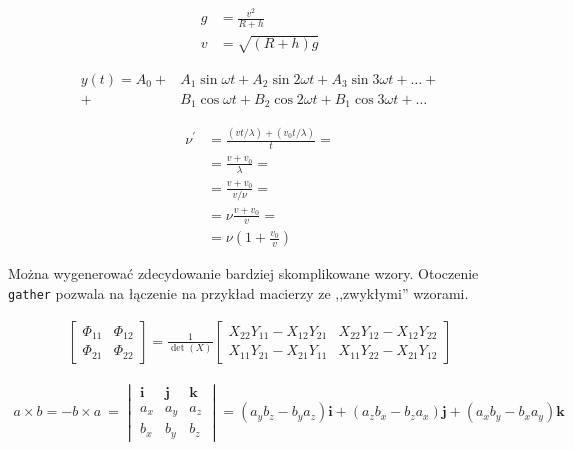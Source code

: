 \begin{align}
    g & = \frac{v^2}{R+h} \\
    v & = \sqrt{ \left( R+h \right) g }
\end{align}

\begin{align}
 y(t) = A_0 
 +& A_1 \sin \omega t + 
    A_2 \sin 2 \omega t + 
    A_3 \sin 3 \omega t + \ldots + \nonumber \\
 +& B_1 \cos \omega t + 
    B_2 \cos 2 \omega t + 
    B_1 \cos 3 \omega t + \ldots
\end{align}

\begin{align}
 \nu^\prime  &= \frac{\left(vt / \lambda \right) + \left( v_0t / \lambda \right)}{t} = \nonumber\\
            &= \frac{v + v_0}{\lambda} = \nonumber\\
            &= \frac{v + v_0}{v / \nu} = \nonumber\\
            &= \nu \frac{v+v_0}{v} = \nonumber\\
            &= \nu \left( 1 + \frac{v_0}{v} \right)
\end{align}

Można wygenerować zdecydowanie bardziej skomplikowane wzory. Otoczenie \texttt{gather} pozwala na łączenie na przykład macierzy ze ,,zwykłymi'' wzorami.

\begin{gather}
 \begin{bmatrix} \Phi_{11} & \Phi_{12} \\ \Phi_{21} & \Phi_{22} \end{bmatrix}
 =
 \frac{1}{\det(X)}
  \begin{bmatrix}
   X_{22} Y_{11} - X_{12} Y_{21} &
   X_{22} Y_{12} - X_{12} Y_{22} \\
   X_{11} Y_{21} - X_{21} Y_{11} &
   X_{11} Y_{22} - X_{21} Y_{12} 
   \end{bmatrix}
\end{gather}

\begin{gather}
a \times b = -b \times a~= 
\begin{vmatrix}
\pmb{i}    &     \pmb{j}      &      \pmb{k}    \\
a_x        &     a_y          &      a_z        \\
b_x        &     b_y          &      b_z        
\end{vmatrix}
= \left(a_y b_z - b_y a_z \right)\pmb{i} 
+ \left(a_z b_x - b_z a_x \right)\pmb{j} 
+ \left(a_x b_y - b_x a_y \right)\pmb{k} 
\end{gather}

